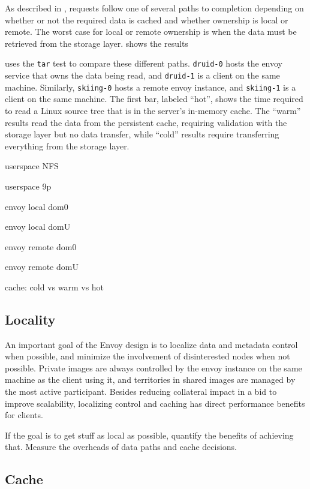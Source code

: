 As described in , requests follow one of several paths to completion depending on whether or not the required data is cached and whether ownership is local or remote. The worst case for local or remote ownership is when the data must be retrieved from the storage layer.  shows the results 

 uses the \texttt{tar} test to compare these different paths. \texttt{druid-0} hosts the envoy service that owns the data being read, and \texttt{druid-1} is a client on the same machine. Similarly, \texttt{skiing-0} hosts a remote envoy instance, and \texttt{skiing-1} is a client on the same machine. The first bar, labeled ``hot'', shows the time required to read a Linux source tree that is in the server's in-memory cache. The ``warm'' results read the data from the persistent cache, requiring validation with the storage layer but no data transfer, while ``cold'' results require transferring everything from the storage layer.



userspace NFS

userspace 9p

envoy local dom0

envoy local domU

envoy remote dom0

envoy remote domU

cache: cold vs warm vs hot

\subsection{Locality}

An important goal of the Envoy design is to localize data and metadata control when possible, and minimize the involvement of disinterested nodes when not possible. Private images are always controlled by the envoy instance on the same machine as the client using it, and territories in shared images are managed by the most active participant. Besides reducing collateral impact in a bid to improve scalability, localizing control and caching has direct performance benefits for clients.


If the goal is to get stuff as local as possible, quantify the benefits of achieving that. Measure the overheads of data paths and cache decisions.

\subsection{Cache}


